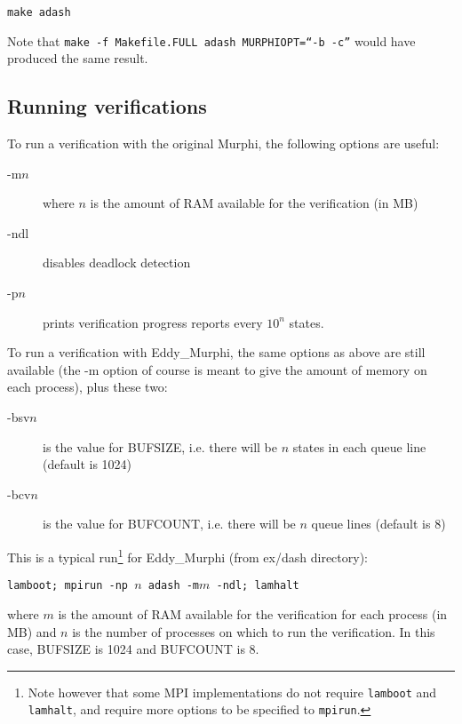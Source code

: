\documentclass{article}
\begin{document}
{\tt make adash}

Note that {\tt make -f Makefile.FULL adash MURPHIOPT=``-b -c''} would have
produced the same result.


\subsection{Running verifications}

To run a verification with the original Murphi, the following options are
useful:

\begin{description}

	\item[-m$n$] where $n$ is the amount of RAM available for the
verification (in MB)

	\item[-ndl] disables deadlock detection

	\item[-p$n$] prints verification progress reports every $10^{n}$ states.

\end{description}

To run a verification with Eddy\_Murphi, the same options as above are still
available (the -m option of course is meant to give the amount of memory on each
process), plus these two:

\begin{description}

	\item[-bsv$n$] is the value for BUFSIZE, i.e. there will be $n$ states
in each queue line (default is 1024)

	\item[-bcv$n$] is the value for BUFCOUNT, i.e. there will be $n$ queue
lines (default is 8)

\end{description}

This is a typical run\footnote{\label{lamboot.note}Note however that some MPI
implementations do not require {\tt lamboot} and {\tt lamhalt}, and require more
options to be specified to {\tt mpirun}.} for Eddy\_Murphi (from ex/dash
directory):

{\tt lamboot; mpirun -np $n$ adash -m$m$ -ndl; lamhalt}

where $m$ is the amount of RAM available for the verification for each process
(in MB) and $n$ is the number of processes on which to run the verification. In
this case, BUFSIZE is 1024 and BUFCOUNT is 8.
\end{document}
